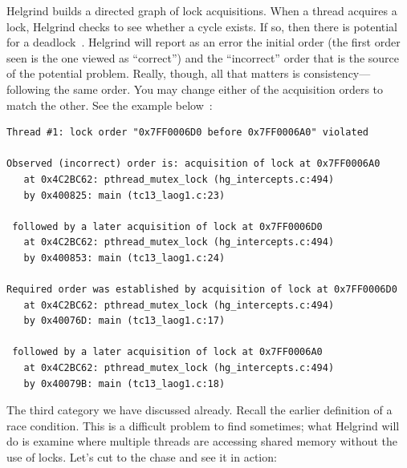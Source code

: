 \documentclass[a4paper]{report}
\begin{document}
Helgrind builds a directed graph of lock acquisitions. When a thread acquires a lock, Helgrind checks to see whether a cycle exists. If so, then there is potential for a deadlock~\cite{helgrind}. Helgrind will report as an error the initial order (the first order seen is the one viewed as ``correct'') and the ``incorrect'' order that is the source of the potential problem. Really, though, all that matters is consistency---following the same order. You may change either of the acquisition orders to match the other. See the example below~\cite{helgrind}:

\begin{lstlisting}
Thread #1: lock order "0x7FF0006D0 before 0x7FF0006A0" violated

Observed (incorrect) order is: acquisition of lock at 0x7FF0006A0
   at 0x4C2BC62: pthread_mutex_lock (hg_intercepts.c:494)
   by 0x400825: main (tc13_laog1.c:23)

 followed by a later acquisition of lock at 0x7FF0006D0
   at 0x4C2BC62: pthread_mutex_lock (hg_intercepts.c:494)
   by 0x400853: main (tc13_laog1.c:24)

Required order was established by acquisition of lock at 0x7FF0006D0
   at 0x4C2BC62: pthread_mutex_lock (hg_intercepts.c:494)
   by 0x40076D: main (tc13_laog1.c:17)

 followed by a later acquisition of lock at 0x7FF0006A0
   at 0x4C2BC62: pthread_mutex_lock (hg_intercepts.c:494)
   by 0x40079B: main (tc13_laog1.c:18)
\end{lstlisting}

The third category we have discussed already. Recall the earlier definition of a race condition. This is a difficult problem to find sometimes; what Helgrind will do is examine where multiple threads are accessing shared memory without the use of locks. Let's cut to the chase and see it in action:
\end{document}
